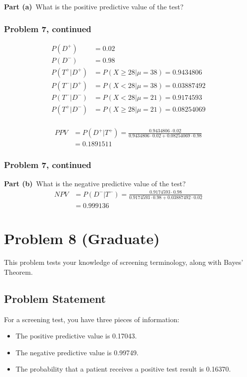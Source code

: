 \documentclass[12pt]{article}
\theoremstyle{definition}
\begin{document}
\bigskip
\noindent
{\bf Part (a)}\ What is the positive predictive value of the test?


\newpage
\subsubsection*{Problem 7, continued}
\begin{align*}
P(D^+) &= 0.02 \\
P(D^-) &= 0.98 \\
P(T^+|D^+) &= P(X \geq 28|\mu = 38) = 0.9434806\\
P(T^-|D^+) &= P(X<28|\mu = 38) = 0.03887492\\
P(T^-|D^-) &= P(X<28|\mu = 21) = 0.9174593\\
P(T^+|D^-) &= P(X \geq 28|\mu = 21) = 0.08254069\\
\end{align*}

\begin{align*}
PPV &= P(D^+|T^+) = \frac{0.9434806 \cdot 0.02}{0.9434806 \cdot 0.02 + 0.08254069 \cdot 0.98}\\
&= 0.1891511
\end{align*}

\newpage
\subsubsection*{Problem 7, continued}

\noindent
{\bf Part (b)}\ What is the negative predictive value of the test?
\begin{align*}
NPV &= P(D^-|T^-) = \frac{0.9174593 \cdot 0.98}{0.9174593 \cdot 0.98 + 0.03887492 \cdot 0.02}\\
&= 0.999136
\end{align*}

\newpage
\section*{Problem 8 (Graduate)}

This problem tests your knowledge of screening terminology, along with Bayes' Theorem.

\subsection*{Problem Statement}

For a screening test, you have three pieces of information:
\begin{itemize}
	\item The positive predictive value is 0.17043.
	\item The negative predictive value is 0.99749.
	\item The probability that a patient receives a positive test result is 0.16370.
\end{itemize}
\end{document}
